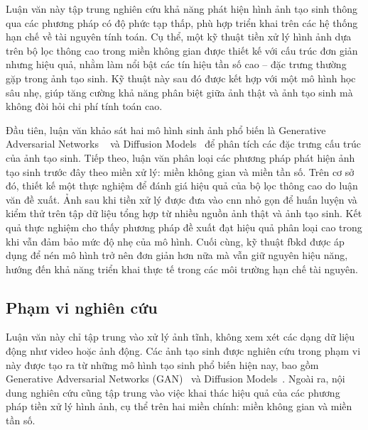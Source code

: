 Luận văn này tập trung nghiên cứu khả năng phát hiện hình ảnh tạo sinh thông qua các phương pháp có độ phức tạp thấp, phù hợp triển khai trên các hệ thống hạn chế về tài nguyên tính toán. Cụ thể, một kỹ thuật tiền xử lý hình ảnh dựa trên bộ lọc thông cao trong miền không gian được thiết kế với cấu trúc đơn giản nhưng hiệu quả, nhằm làm nổi bật các tín hiệu tần số cao – đặc trưng thường gặp trong ảnh tạo sinh. Kỹ thuật này sau đó được kết hợp với một mô hình học sâu nhẹ, giúp tăng cường khả năng phân biệt giữa ảnh thật và ảnh tạo sinh mà không đòi hỏi chi phí tính toán cao. 

Đầu tiên, luận văn khảo sát hai mô hình sinh ảnh phổ biến là Generative Adversarial Networks ~\cite{Goodfellow2014GenerativeAN} và Diffusion Models~\cite{Ho2020DenoisingDP} để phân tích các đặc trưng cấu trúc của ảnh tạo sinh.
%
Tiếp theo, luận văn phân loại các phương pháp phát hiện ảnh tạo sinh trước đây theo miền xử lý: miền không gian và miền tần số.
%
Trên cơ sở đó, thiết kế một thực nghiệm để đánh giá hiệu quả của bộ lọc thông cao do luận văn đề xuất. Ảnh sau khi tiền xử lý được đưa vào \gls{cnn} nhỏ gọn để huấn luyện và kiểm thử trên tập dữ liệu tổng hợp từ nhiều nguồn ảnh thật và ảnh tạo sinh. Kết quả thực nghiệm cho thấy phương pháp đề xuất đạt hiệu quả phân loại cao trong khi vẫn đảm bảo mức độ nhẹ của mô hình. Cuối cùng, kỹ thuật \gls{fbkd} được áp dụng để nén mô hình trở nên đơn giản hơn nữa mà vẫn giữ nguyên hiệu năng, hướng đến khả năng triển khai thực tế trong các môi trường hạn chế tài nguyên.

\subsection{Phạm vi nghiên cứu}

%

Luận văn này chỉ tập trung vào xử lý ảnh tĩnh, không xem xét các dạng dữ liệu động như video hoặc ảnh động. Các ảnh tạo sinh được nghiên cứu trong phạm vi này được tạo ra từ những mô hình tạo sinh phổ biến hiện nay, bao gồm Generative Adversarial Networks (GAN)~\cite{Goodfellow2014GenerativeAN} và Diffusion Models~\cite{Ho2020DenoisingDP}. Ngoài ra, nội dung nghiên cứu cũng tập trung vào việc khai thác hiệu quả của các phương pháp tiền xử lý hình ảnh, cụ thể trên hai miền chính: miền không gian và miền tần số.


